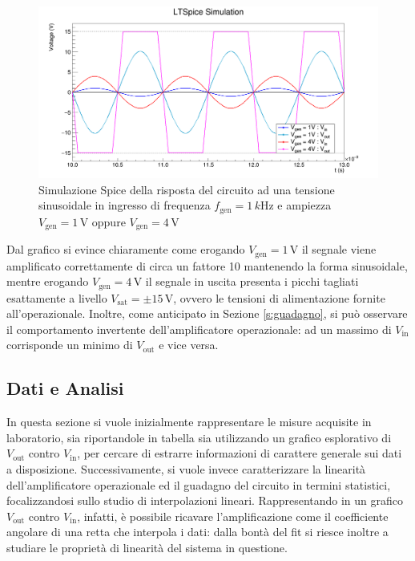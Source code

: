 \documentclass[a4paper,11pt]{article} %
\begin{document}
\begin{figure}[H]
	\centering
	\includegraphics[width=\linewidth]{../Plots/Report_Plots/opamp_spice_1V_4V.png}
	\caption{Simulazione Spice della risposta del circuito ad una tensione sinusoidale in ingresso di frequenza
	$f_{\text{gen}}=1\,\si{k\hertz}$ e ampiezza $V_{\text{gen}}=1\,\si{\volt}$ oppure $V_{\text{gen}}=4\,\si{\volt}$}
	\label{i:opamp_simulation}
\end{figure}

\noindent Dal grafico si evince chiaramente come erogando $V_{\text{gen}}=1\,\si{\volt}$ il segnale viene amplificato
correttamente di circa un fattore 10 mantenendo la forma sinusoidale, mentre erogando $V_{\text{gen}}=4\,\si{\volt}$ il
segnale in uscita presenta i picchi tagliati esattamente a livello $V_{\text{sat}}=\pm 15\,\si{\volt}$, ovvero le
tensioni di alimentazione fornite all'operazionale. Inoltre, come anticipato in Sezione \ref{s:guadagno}, si può osservare il comportamento invertente
dell'amplificatore operazionale: ad un massimo di $V_{\text{in}}$ corrisponde un minimo di $V_{\text{out}}$ e vice
versa.\\



\subsection{Dati e Analisi}
In questa sezione si vuole inizialmente rappresentare le misure acquisite in laboratorio, sia riportandole in tabella
sia utilizzando un grafico esplorativo di $V_{\text{out}}$ contro $V_{\text{in}}$, per cercare di estrarre informazioni
di carattere generale sui dati a disposizione. Successivamente, si vuole invece caratterizzare la linearità
dell'amplificatore operazionale ed il guadagno del circuito in termini statistici, focalizzandosi sullo studio di interpolazioni
lineari. Rappresentando in un grafico $V_{\text{out}}$ contro $V_{\text{in}}$, infatti, è possibile ricavare
l'amplificazione come il coefficiente angolare di una retta che interpola i dati: dalla bontà del fit si riesce inoltre a
studiare le proprietà di linearità del sistema in questione.
\end{document}
